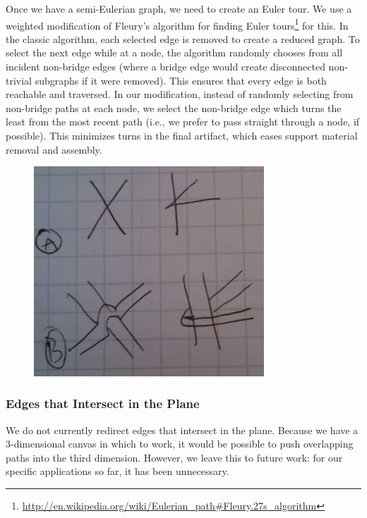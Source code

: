 Once we have a semi-Eulerian graph, we need to create an Euler tour.  We use a weighted modification of Fleury's algorithm for finding Euler tours\footnote{\url{http://en.wikipedia.org/wiki/Eulerian_path\#Fleury.27s_algorithm}} for this.  In the classic algorithm, each selected edge is removed to create a reduced graph.  To select the next edge while at a node, the algorithm randomly chooses from all incident non-bridge edges (where a bridge edge would create disconnected non-trivial subgraphs if it were removed).  This ensures that every edge is both reachable and traversed.  In our modification, instead of randomly selecting from non-bridge paths at each node, we select the non-bridge edge which turns the least from the most recent path (i.e., we prefer to pass straight through a node, if possible).  This minimizes turns in the final artifact, which eases support material removal and assembly.

\begin{figure}[h!]
\centering
    \includegraphics[width=3.4in]{figures/placeholder/templates.jpg}
\caption{}
\label{fig:templates}
\end{figure}

\subsubsection{Edges that Intersect in the Plane}
We do not currently redirect edges that intersect in the plane.  Because we have a 3-dimensional canvas in which to work, it would be possible to push overlapping paths into the third dimension.  However, we leave this to future work: for our specific applications so far, it has been unnecessary.

